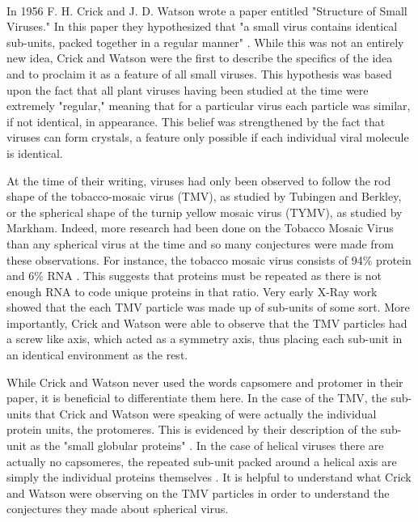 \documentclass[12pt,letter]{article}
\begin{document}
\paragraph{}
In 1956  F. H. Crick and J. D. Watson wrote a paper entitled "Structure of Small Viruses." In this paper they hypothesized that "a small virus contains identical sub-units, packed together in a regular manner" \cite[p 473]{Crick:1956}. While this was not an entirely new idea, Crick and Watson were the first to describe the specifics of the idea and to proclaim it as a feature of all small viruses. This hypothesis was based upon the fact that all plant viruses having been studied at the time were extremely "regular," meaning that for a particular virus each particle was similar, if not identical, in appearance. This belief was strengthened by the fact that viruses can form crystals, a feature only possible if each individual viral molecule is identical.

At the time of their writing, viruses had only been observed to follow the rod shape of the tobacco-mosaic virus (TMV), as studied by Tubingen and Berkley, or the spherical shape of the turnip yellow mosaic virus (TYMV), as studied by Markham. Indeed, more research had been done on the Tobacco Mosaic Virus than any spherical virus at the time and so many conjectures were made from these observations. For instance, the tobacco mosaic virus consists of 94\% protein and 6\% RNA \cite[p 473]{Crick:1956}. This suggests that proteins must be repeated as there is not enough RNA to code unique proteins in that ratio. Very early X-Ray work showed that the each TMV particle was made up of sub-units of some sort. More importantly, Crick and Watson were able to observe that the TMV particles had a screw like axis, which acted as a symmetry axis, thus placing each sub-unit in an identical environment as the rest.

While Crick and Watson never used the words capsomere and protomer in their paper, it is beneficial to differentiate them here. In the case of the TMV, the sub-units that Crick and Watson were speaking of were actually the individual protein units, the protomeres. This is evidenced by their description of the sub-unit as the "small globular proteins" \cite[p 473]{Crick:1956}. In the case of helical viruses there are actually no capsomeres, the repeated sub-unit packed around a helical axis are simply the individual proteins themselves \cite[p 474]{Crick:1956}. It is helpful to understand what Crick and Watson were observing on the TMV particles in order to understand the conjectures they made about spherical virus.
\end{document}
